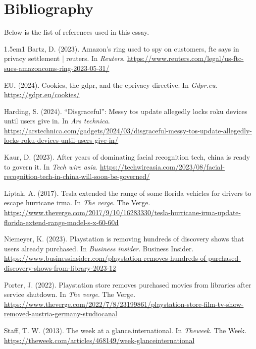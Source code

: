 \documentclass[11pt]{article}
\begin{document}
 \newpage

\section{Bibliography}
\label{sec:orga0cf190}
Below is the list of references used in this essay.  \\

\begin{hangparas}{1.5em}{1}
\hypertarget{citeproc_bib_item_1}{Bartz, D. (2023). Amazon’s ring used to spy on customers, ftc says in privacy settlement | reuters. In \textit{Reuters}. \url{https://www.reuters.com/legal/us-ftc-sues-amazoncoms-ring-2023-05-31/}}

\hypertarget{citeproc_bib_item_2}{EU. (2024). Cookies, the gdpr, and the eprivacy directive. In \textit{Gdpr.eu}. \url{https://gdpr.eu/cookies/}}

\hypertarget{citeproc_bib_item_3}{Harding, S. (2024). “Disgraceful”: Messy tos update allegedly locks roku devices until users give in. In \textit{Ars technica}. \url{https://arstechnica.com/gadgets/2024/03/disgraceful-messy-tos-update-allegedly-locks-roku-devices-until-users-give-in/}}

\hypertarget{citeproc_bib_item_4}{Kaur, D. (2023). After years of dominating facial recognition tech, china is ready to govern it. In \textit{Tech wire asia}. \url{https://techwireasia.com/2023/08/facial-recognition-tech-in-china-will-soon-be-governed/}}

\hypertarget{citeproc_bib_item_5}{Liptak, A. (2017). Tesla extended the range of some florida vehicles for drivers to escape hurricane irma. In \textit{The verge}. The Verge. \url{https://www.theverge.com/2017/9/10/16283330/tesla-hurricane-irma-update-florida-extend-range-model-s-x-60-60d}}

\hypertarget{citeproc_bib_item_6}{Niemeyer, K. (2023). Playstation is removing hundreds of discovery shows that users already purchased. In \textit{Business insider}. Business Insider. \url{https://www.businessinsider.com/playstation-removes-hundreds-of-purchased-discovery-shows-from-library-2023-12}}

\hypertarget{citeproc_bib_item_7}{Porter, J. (2022). Playstation store removes purchased movies from libraries after service shutdown. In \textit{The verge}. The Verge. \url{https://www.theverge.com/2022/7/8/23199861/playstation-store-film-tv-show-removed-austria-germany-studiocanal}}

\hypertarget{citeproc_bib_item_8}{Staff, T. W. (2013). The week at a glance.international. In \textit{Theweek}. The Week. \url{https://theweek.com/articles/468149/week-glanceinternational}}


\end{hangparas}
\end{document}

